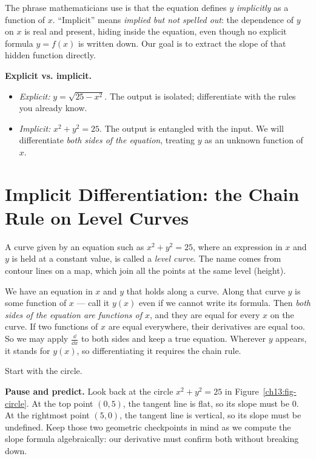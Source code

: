 The phrase mathematicians use is that the equation defines $y$ \emph{implicitly} as a function of
$x$. ``Implicit'' means \emph{implied but not spelled out}: the dependence of $y$ on $x$ is real and
present, hiding inside the equation, even though no explicit formula $y=f(x)$ is written down. Our
goal is to extract the slope of that hidden function directly.

\begin{focusbox}
\textbf{Explicit vs. implicit.}
\begin{itemize}
\item \emph{Explicit:} $y = \sqrt{25-x^2}$. The output is isolated; differentiate with the rules you
already know.
\item \emph{Implicit:} $x^2 + y^2 = 25$. The output is entangled with the input. We will
differentiate \emph{both sides of the equation}, treating $y$ as an unknown function of $x$.
\end{itemize}
\end{focusbox}

\section{Implicit Differentiation: the Chain Rule on Level Curves}
\label{ch13:implicit}

A curve given by an equation such as $x^2+y^2=25$, where an expression in $x$ and $y$ is held at a
constant value, is called a \emph{level curve}. The name comes from contour lines on a map, which join
all the points at the same level (height).

We have an equation in $x$ and $y$ that holds along a curve. Along that
curve $y$ is some function of $x$ --- call it $y(x)$ even if we cannot write its formula. Then
\emph{both sides of the equation are functions of $x$}, and they are equal for every $x$ on the
curve. If two functions of $x$ are equal everywhere, their derivatives are equal too. So we may
apply $\frac{\dd}{\dd x}$ to both sides and keep a true equation. Wherever $y$ appears, it stands
for $y(x)$, so differentiating it requires the chain rule.

Start with the circle.

\begin{recoverybox}
\textbf{Pause and predict.} Look back at the circle $x^2 + y^2 = 25$ in Figure~\ref{ch13:fig-circle}.
At the top point $(0,5)$, the tangent line is flat, so its slope must be $0$.
At the rightmost point $(5,0)$, the tangent line is vertical, so its slope must be undefined.
Keep those two geometric checkpoints in mind as we compute the slope formula algebraically:
our derivative must confirm both without breaking down.
\end{recoverybox}

